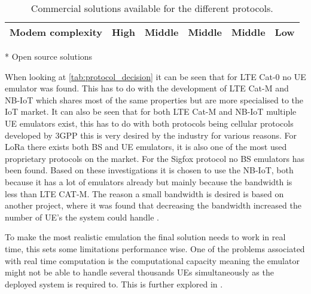 \begin{table}[H]
{\begin{tabular}{|c|c|c|c|c|c|}
Modem complexity	& High 				& Middle 				& Middle 			& Middle 		& Low				\\ \hline
\end{tabular}}
\raggedright \scriptsize{ * Open source solutions} 
\caption{Commercial solutions available for the different protocols. \citep{UE_list, Amarisoft_solutions, SRS_solutions, LORA_solutions, Things_solutions, Mira_solutions, Telit_solutions, telefonicaid_solutions, murata_solutions}}%
\label{tab:protocol_decision}
\end{table}


When looking at \autoref{tab:protocol_decision} it can be seen that for \gls{LTE} Cat-0 no \gls{UE} emulator was found. This has to do with the development of \gls{LTE} Cat-M and \gls{NB-IoT} which shares most of the same properties but are more specialised to the \gls{IoT} market. It can also be seen that for both \gls{LTE} Cat-M and \gls{NB-IoT} multiple \gls{UE} emulators exist, this has to do with both protocols being cellular protocols developed by \gls{3GPP} this is very desired by the industry for various reasons. For \gls{LoRa} there exists both  \gls{BS} and \gls{UE} emulators, it is also one of the most used proprietary protocols on the market. For the Sigfox protocol no \gls{BS} emulators has been found. Based on these investigations it is chosen to use the \gls{NB-IoT}, both because it has a lot of emulators already but mainly because the bandwidth is less than LTE CAT-M. The reason a small bandwidth is desired is based on another project, where it was found that decreasing the bandwidth increased the number of UE's the system could handle \citep{thesis_report}.


To make the most realistic emulation the final solution needs to work in real time, this sets some limitations performance wise. One of the problems associated with real time computation is the computational capacity meaning the emulator might not be able to handle several thousands \gls{UE}s simultaneously as the deployed system is required to. This is further explored in .


